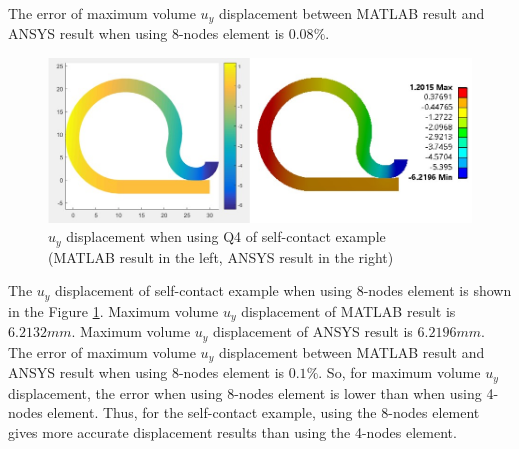 The error of maximum volume $u_y$ displacement between MATLAB result and ANSYS result when using 8-nodes element is $0.08\%$.
\newline
\begin{figure}[H]
    \centering
    \includegraphics[scale=0.66]{Figures/chapter5/s_q4_uy.jpg}
    \decoRule
    \caption{$u_y$ displacement when using Q4 of self-contact example \\
    (MATLAB result in the left, ANSYS result in the right)}
    \label{fig:s_q4_uy}
\end{figure}
\noindent
The $u_y$ displacement of self-contact example when using 8-nodes element is shown in the Figure \ref{fig:s_q4_uy}.
Maximum volume $u_y$ displacement of MATLAB result is $6.2132mm$.
Maximum volume $u_y$ displacement of ANSYS result is $6.2196mm$.
The error of maximum volume $u_y$ displacement between MATLAB result and ANSYS result when using 8-nodes element is $0.1\%$.
So, for maximum volume $u_y$ displacement, the error when using 8-nodes element is lower than when using 4-nodes element.
\vspace{0.38cm}
\newline
Thus, for the self-contact example, using the 8-nodes element gives more accurate displacement results than using the 4-nodes element.
\newpage
